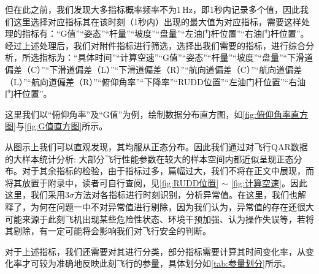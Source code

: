 \documentclass{MathorCupModeling}
\begin{document}
	但在此之前，我们发现大多指标概率频率不为$1\,\text{Hz}$，即1秒内记录多个值，因此我们这里选择对应指标其在该时刻（1秒内）出现的最大值为对应指标，需要这样处理的指标有：“G值”“姿态”“杆量”“坡度”“盘量”“左油门杆位置”“右油门杆位置”。经过上述处理后，我们对附件指标进行筛选，选择出我们需要的指标，进行综合分析，所选指标为：“具体时间”“计算空速”“G值”“姿态”“杆量”“坡度”“盘量”“下滑道偏差（C）”“下滑道偏差（L）”“下滑道偏差（R）”“航向道偏差（C）”“航向道偏差（L）”“航向道偏差（R）”“俯仰角率”“下降率”“RUDD位置”“左油门杆位置”“右油门杆位置”。

	这里我们以“俯仰角率”及“G值”为例，绘制数据分布直方图，如\textcolor{blue}{\cref{fig:俯仰角率直方图}}与\textcolor{blue}{\cref{fig:G值直方图}}所示。


	从图示上我们可以直观发现，其均服从正态分布。因此我们通过对飞行QAR数据的大样本统计分析: 大部分飞行性能参数在较大的样本空间内都近似呈现正态分布\textcolor{blue}{\cite{Paper:正态分布}}。对于其余指标的检验，由于指标过多，篇幅过大，我们不将在正文中展现，而将其放置于附录中，读者可自行查阅，见\textcolor{blue}{\cref{fig:RUDD位置}} $\sim$ \textcolor{blue}{\cref{fig:计算空速}}。因此这里，我们采用$3\sigma$方法对各指标进行时刻识别，分析异常值。在这里，我们也解释了，为何在问题一中不对异常值进行剔除，因为我们认为，异常值的存在还很大可能来源于此刻飞机出现某些危险性状态、环境干预加强、认为操作失误等，若将其剔除，有一定可能将会影响我们对飞行安全的判断。

	对于上述指标，我们还需要对其进行分类，部分指标需要计算其时间变化率，从变化率才可较为准确地反映此刻飞行的参量，具体划分如\textcolor{blue}{\cref{tab:参量划分}}所示。
\begin{table}[H]
	\centering
	\caption{参量划分及处理方法}
	\label{tab:参量划分}
\end{table}
  
\end{document}
